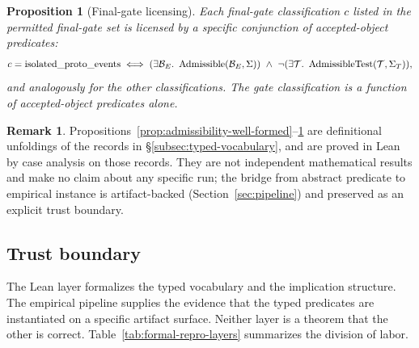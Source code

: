 \documentclass[11pt]{article}
\newtheorem{proposition}[theorem]{Proposition}
\theoremstyle{definition}
\newtheorem{remark}[theorem]{Remark}
\begin{document}
\begin{proposition}[Final-gate licensing]
\label{prop:final-gate-licensing}
Each final-gate classification $c$ listed in the permitted final-gate set is licensed by a specific conjunction of accepted-object predicates:
\[
  c = \textnormal{isolated\_proto\_events} \iff (\exists \mathcal{B}_E.\ \operatorname{Admissible}(\mathcal{B}_E, \Sigma))\ \wedge\ \neg(\exists \mathcal{T}.\ \operatorname{AdmissibleTest}(\mathcal{T}, \Sigma_T)),
\]
and analogously for the other classifications. The gate classification is a function of accepted-object predicates alone.
\end{proposition}

\begin{remark}
\label{rem:kernel-is-not-empirical}
Propositions~\ref{prop:admissibility-well-formed}--\ref{prop:final-gate-licensing} are definitional unfoldings of the records in \S\ref{subsec:typed-vocabulary}, and are proved in Lean by case analysis on those records. They are not independent mathematical results and make no claim about any specific run; the bridge from abstract predicate to empirical instance is artifact-backed (Section~\ref{sec:pipeline}) and preserved as an explicit trust boundary.
\end{remark}

\subsection{Trust boundary}
\label{subsec:trust-boundary}

The Lean layer formalizes the typed vocabulary and the implication structure. The empirical pipeline supplies the evidence that the typed predicates are instantiated on a specific artifact surface. Neither layer is a theorem that the other is correct. Table~\ref{tab:formal-repro-layers} summarizes the division of labor.
\end{document}
